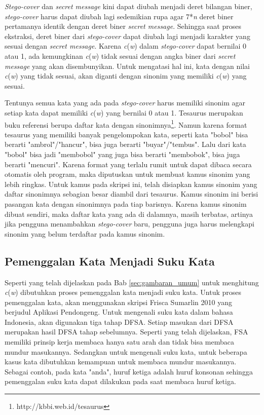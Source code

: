 \textit{Stego-cover} dan \textit{secret message} kini dapat diubah menjadi deret bilangan biner, \textit{stego-cover} harus dapat diubah lagi sedemikian rupa agar 7*\textit{n} deret biner pertamanya identik dengan deret biner \textit{secret message}. Sehingga saat proses ekstraksi, deret biner dari \textit{stego-cover} dapat diubah lagi menjadi karakter yang sesuai dengan \textit{secret message}. Karena \textit{c}(\textit{w}) dalam \textit{stego-cover} dapat bernilai 0 atau 1, ada kemungkinan \textit{c}(\textit{w}) tidak sesuai dengan angka biner dari \textit{secret message} yang akan disembunyikan. Untuk mengatasi hal ini, kata dengan nilai \textit{c}(\textit{w}) yang tidak sesuai, akan diganti dengan sinonim yang memiliki \textit{c}(\textit{w}) yang sesuai.

Tentunya semua kata yang ada pada \textit{stego-cover} harus memiliki sinonim agar setiap kata dapat memiliki \textit{c}(\textit{w}) yang bernilai 0 atau 1. Tesaurus merupakan buku referensi berupa daftar kata dengan sinonimnya\footnote{http://kbbi.web.id/tesaurus}. Namun karena format tesaurus yang memiliki banyak pengelompokan kata, seperti kata "bobol" bisa berarti "ambrol"/"hancur", bisa juga berarti "buyar"/"tembus". Lalu dari kata "bobol" bisa jadi "membobol" yang juga bisa berarti "membobok", bisa juga berarti "mencuri". Karena format yang terlalu rumit untuk dapat dibaca secara otomatis oleh program, maka diputuskan untuk membuat kamus sinonim yang lebih ringkas. Untuk kamus pada skripsi ini, telah disiapkan kamus sinonim yang daftar sinonimnya sebagian besar diambil dari tesaurus. Kamus sinonim ini berisi pasangan kata dengan sinonimnya pada tiap barisnya. Karena kamus sinonim dibuat sendiri, maka daftar kata yang ada di dalamnya, masih terbatas, artinya jika pengguna menambahkan \textit{stego-cover} baru, pengguna juga harus melengkapi sinonim yang belum terdaftar pada kamus sinonim.

\subsection{Pemenggalan Kata Menjadi Suku Kata}
Seperti yang telah dijelaskan pada Bab \ref{sec:gambaran_umum} untuk menghitung \textit{c}(\textit{w}) dibutuhkan proses pemenggalan kata menjadi suku kata. Untuk proses pemenggalan kata, akan menggunakan skripsi Frisca Sumarlin 2010 yang berjudul Aplikasi Pendongeng\cite{Frisca:2014}. Untuk mengenali suku kata dalam bahasa Indonesia, akan digunakan tiga tahap DFSA. Setiap masukan dari DFSA merupakan hasil DFSA tahap sebelumnya. Seperti yang telah dijelaskan, FSA memiliki prinsip kerja membaca hanya satu arah dan tidak bisa membaca mundur masukannya. Sedangkan untuk mengenali suku kata, untuk beberapa kasus kata dibutuhkan kemampuan untuk membaca mundur masukannya. Sebagai contoh, pada kata "anda", huruf ketiga adalah huruf konsonan sehingga pemenggalan suku kata dapat dilakukan pada saat membaca huruf ketiga.

